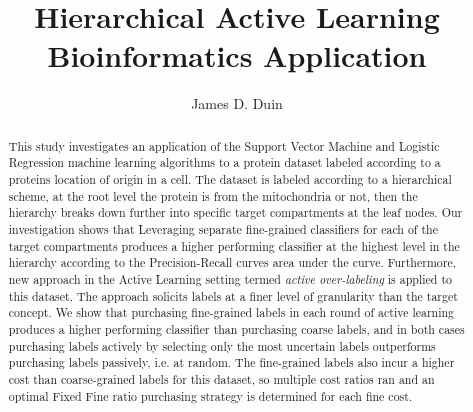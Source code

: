 \documentclass[ms]{nuthesis}
\begin{document}
\frontmatter

\title{Hierarchical Active Learning Bioinformatics Application}
\author{James D. Duin}
\maketitle
\begin{abstract}
  \par This study investigates an application of the Support Vector Machine
   and Logistic Regression machine learning algorithms to a protein dataset labeled
   according to a proteins location of origin in a cell. The dataset is labeled
   according to a
    hierarchical scheme, at the root level the protein is from the mitochondria
    or not, then the hierarchy breaks down further into specific target
    compartments at the leaf nodes. Our investigation shows that Leveraging separate
    fine-grained classifiers for each of the target compartments produces a higher
    performing classifier at the highest level in the hierarchy according
    to the Precision-Recall curves area under the curve. Furthermore, new approach in the
     Active Learning setting termed \textit{active over-labeling} is applied to this dataset.
    The approach solicits labels at a finer level of granularity than the target concept.
    We show that purchasing fine-grained labels in each round of active learning produces a
      higher performing classifier than purchasing coarse labels, and in both cases purchasing
      labels actively by selecting only the most uncertain labels outperforms purchasing labels
      passively, i.e. at random. The fine-grained labels also incur a higher cost than coarse-grained
      labels for this dataset, so multiple cost ratios ran and an optimal Fixed Fine
      ratio purchasing strategy is determined for each fine cost.
\end{abstract}
\end{document}
